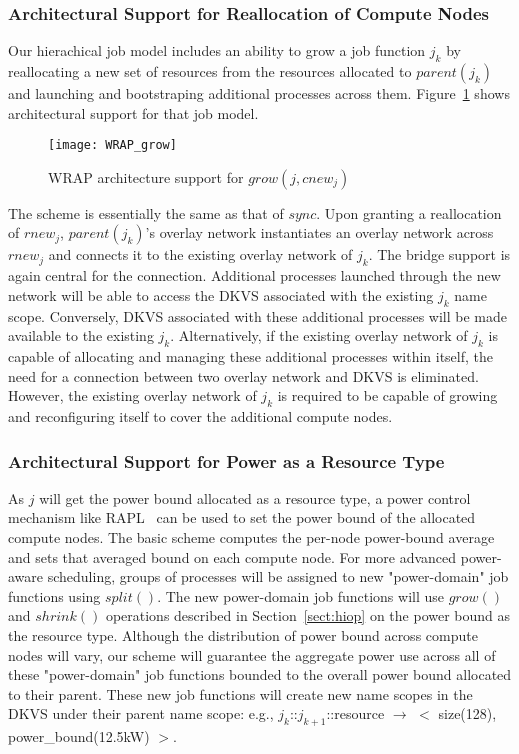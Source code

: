 \subsubsection{Architectural Support for Reallocation of Compute Nodes}
Our hierachical job model includes an ability to grow a job function $j_k$
by reallocating a new set of resources from the resources allocated
to $parent(j_k)$ and launching and bootstraping additional processes
across them.
Figure~\ref{fig:ext2} shows architectural support for that
job model.
\begin{figure}
  \centering
    \texttt{[image: WRAP\_grow]}
  \caption{WRAP architecture support for ${grow(j, cnew_j)}$}
  \label{fig:ext2}
\end{figure}
The scheme is essentially the same as that of $sync$.
Upon granting a reallocation of $rnew_j$,
$parent(j_k)$'s overlay network instantiates an overlay network
across $rnew_j$ and connects it to the existing overlay network
of $j_k$. The bridge support is again central for the connection.
Additional processes launched through the new network will
be able to access the DKVS associated with the existing $j_k$
name scope. Conversely, DKVS associated with these additional
processes will be made available to the existing $j_k$.
Alternatively, if the existing overlay network of $j_k$ is
capable of allocating and managing these additional processes
within itself, the need for a connection between two overlay
network and DKVS is eliminated. However, the existing overlay network
of $j_k$ is required to be capable of growing and
reconfiguring itself to cover the additional compute nodes.

\subsubsection{Architectural Support for Power as a Resource Type}
As $j$ will get the power bound allocated as a resource type,
a power control mechanism like RAPL~\cite{RountreeRAPL} can be used
to set the power bound of the allocated compute nodes.
The basic scheme computes the per-node power-bound average
and sets that averaged bound on each compute node.
For more advanced power-aware scheduling, groups of processes will
be assigned to new "power-domain" job functions using $split()$.
The new power-domain job functions will use $grow()$ and $shrink()$
operations described in Section~\ref{sect:hiop}
on the power bound as the resource type.
Although the distribution of power bound across compute
nodes will vary, our scheme will guarantee the aggregate power use
across all of these "power-domain" job functions bounded to the overall power bound
allocated to their parent.
These new job functions will create new name scopes
in the DKVS under their parent name scope:
e.g., $j_k$::$j_{k+1}$::resource $\rightarrow$ $<$ size(128), power\_bound(12.5kW) $>$.

